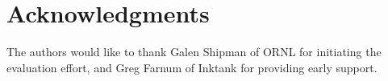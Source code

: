 \section*{Acknowledgments}

The authors would like to thank Galen Shipman of ORNL for initiating the
evaluation effort, and Greg Farnum of Inktank for providing early support.
